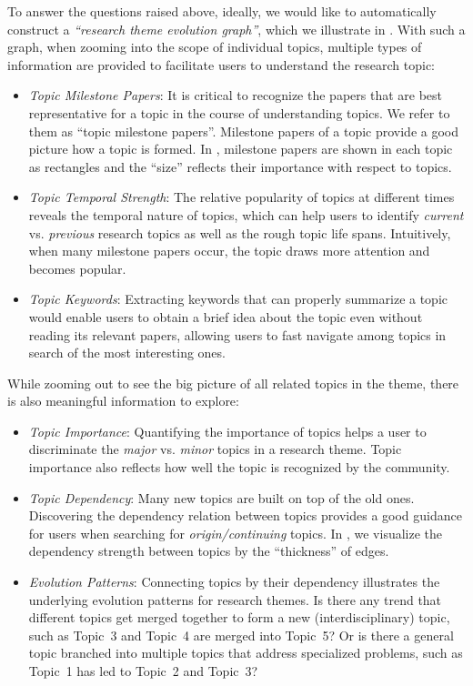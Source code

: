 To answer the questions raised above, ideally, we would like to automatically
construct a \emph{``research theme evolution graph''}, which we illustrate in
.  With such a graph, when zooming into the scope of individual
topics, multiple types of information are provided to facilitate users to
understand the research topic:

\begin{itemize}
\item \emph{Topic Milestone Papers}: It is critical to recognize the papers that
  are best representative for a topic in the course of understanding topics. We
  refer to them as ``topic milestone papers''. Milestone papers of a topic
  provide a good picture how a topic is formed. In , milestone
  papers are shown in each topic as rectangles and the ``size'' reflects their
  importance with respect to topics.
\item \emph{Topic Temporal Strength}: The relative popularity of topics at
  different times reveals the temporal nature of topics, which can help users to
  identify \emph{current} vs. \emph{previous} research topics as well as the
  rough topic life spans. Intuitively, when many milestone papers occur, the
  topic draws more attention and becomes popular.
\item \emph{Topic Keywords}: Extracting keywords that can properly summarize a
  topic would enable users to obtain a brief idea about the topic even without
  reading its relevant papers, allowing users to fast navigate among topics in
  search of the most interesting ones.
\end{itemize}

While zooming out to see the big picture of all related topics in the theme,
there is also meaningful information to explore:
\begin{itemize}
\item  \emph{Topic Importance}: Quantifying the importance of topics helps a
  user to discriminate the \emph{major} vs. \emph{minor} topics in a research
  theme. Topic importance also reflects how well the topic is recognized by the
  community.
\item \emph{Topic Dependency}: Many new topics are built on top of the old ones.
  Discovering the dependency relation between topics provides a good guidance
  for users when searching for \emph{origin/continuing} topics. In
  , we visualize the dependency strength between topics by the
  ``thickness'' of edges.
\item \emph{Evolution Patterns}: Connecting topics by their dependency
  illustrates the underlying evolution patterns for research themes. Is there
  any trend that different topics get merged together to form a new
  (interdisciplinary) topic, such as Topic~3 and Topic~4 are merged into
  Topic~5? Or is there a general topic branched into multiple topics that
  address specialized problems, such as Topic~1 has led to Topic~2 and Topic~3?
\end{itemize}

